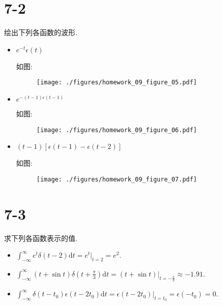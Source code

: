     \section{7-2} 绘出下列各函数的波形.
    \begin{itemize}
        \item $e^{-t}\epsilon\left( t \right) $

            如图:
            \newpage
            \begin{figure}[htbp]
                \centering
                \texttt{[image: ./figures/homework\_09\_figure\_05.pdf]}
            \end{figure}
            
        \item $e^{-\left( t-1 \right) \epsilon\left( t-1 \right) }$

            如图:
            \begin{figure}[htbp]
                \centering
                \texttt{[image: ./figures/homework\_09\_figure\_06.pdf]}
            \end{figure}
            
        \item $\left( t-1 \right) [\epsilon\left( t-1 \right) -\epsilon\left( t-2 \right) ]$

            如图:
            \newpage
            \begin{figure}[htbp]
                \centering
                \texttt{[image: ./figures/homework\_09\_figure\_07.pdf]}
            \end{figure}
            
    \end{itemize}
    \section{7-3} 求下列各函数表示的值.
    \begin{itemize}
        \item $\int_{-\infty}^{\infty}e^{t}\delta\left( t-2 \right) \mathrm{d}t=e^{t}\big|_{t=2}=e^{2}$.
        \item $\int_{-\infty}^{\infty}\left( t+\sin t \right) \delta\left( t+\frac{\pi}{3} \right) \mathrm{d}t=\left( t+\sin t \right) \big|_{t=-\frac{\pi}{3}}\approx -1.91$.
        \item $\int_{-\infty}^{\infty}\delta\left( t-t_0 \right) \epsilon\left( t-2t_0 \right) \mathrm{d}t=\epsilon\left( t-2t_0 \right) \big|_{t=t_0}=\epsilon\left( -t_0 \right) =0$.
    \end{itemize}

